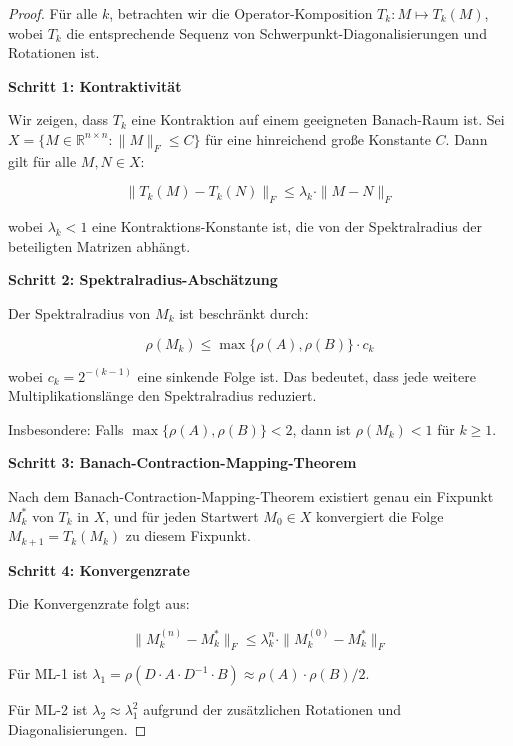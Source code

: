 \documentclass[a4paper,12pt]{article}
\theoremstyle{definition}
\begin{document}
\begin{proof}

Für alle $k$, betrachten wir die Operator-Komposition $T_k: M \mapsto T_k(M)$, wobei $T_k$ die entsprechende Sequenz von Schwerpunkt-Diagonalisierungen und Rotationen ist.

\textbf{Schritt 1: Kontraktivität}

Wir zeigen, dass $T_k$ eine Kontraktion auf einem geeigneten Banach-Raum ist. Sei $X = \{M \in \mathbb{R}^{n \times n} : \|M\|_F \leq C\}$ für eine hinreichend große Konstante $C$. Dann gilt für alle $M, N \in X$:

\begin{equation}
\|T_k(M) - T_k(N)\|_F \leq \lambda_k \cdot \|M - N\|_F
\end{equation}

wobei $\lambda_k < 1$ eine Kontraktions-Konstante ist, die von der Spektralradius der beteiligten Matrizen abhängt.

\textbf{Schritt 2: Spektralradius-Abschätzung}

Der Spektralradius von $M_k$ ist beschränkt durch:

\begin{equation}
\rho(M_k) \leq \max\{\rho(A), \rho(B)\} \cdot c_k
\end{equation}

wobei $c_k = 2^{-(k-1)}$ eine sinkende Folge ist. Das bedeutet, dass jede weitere Multiplikationslänge den Spektralradius reduziert.

Insbesondere: Falls $\max\{\rho(A), \rho(B)\} < 2$, dann ist $\rho(M_k) < 1$ für $k \geq 1$.

\textbf{Schritt 3: Banach-Contraction-Mapping-Theorem}

Nach dem Banach-Contraction-Mapping-Theorem existiert genau ein Fixpunkt $M_k^*$ von $T_k$ in $X$, und für jeden Startwert $M_0 \in X$ konvergiert die Folge $M_{k+1} = T_k(M_k)$ zu diesem Fixpunkt.

\textbf{Schritt 4: Konvergenzrate}

Die Konvergenzrate folgt aus:

\begin{equation}
\|M_k^{(n)} - M_k^*\|_F \leq \lambda_k^n \cdot \|M_k^{(0)} - M_k^*\|_F
\end{equation}

Für ML-1 ist $\lambda_1 = \rho(D \cdot A \cdot D^{-1} \cdot B) \approx \rho(A) \cdot \rho(B) / 2$.

Für ML-2 ist $\lambda_2 \approx \lambda_1^2$ aufgrund der zusätzlichen Rotationen und Diagonalisierungen.


\end{proof}
\end{document}
